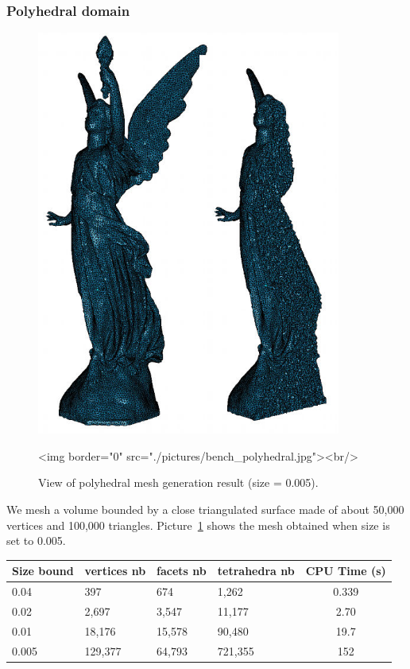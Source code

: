 \subsubsection{Polyhedral domain}

\begin{figure}[ht]
\begin{center}
 \begin{ccTexOnly}
   \includegraphics[width=10cm]{Mesh_3/pictures/bench_polyhedral.jpg}
 \end{ccTexOnly}
 \begin{ccHtmlOnly}
   <img border="0" src="./pictures/bench_polyhedral.jpg"><br/>
 \end{ccHtmlOnly}
 \caption{View of polyhedral mesh generation result (size = 0.005).}
  \label{figure:mesh_3_benchmark_polyhedral}
\end{center}
\end{figure}

We mesh a volume bounded by a close triangulated surface made of about 50,000 vertices and 100,000 triangles.
Picture~\ref{figure:mesh_3_benchmark_polyhedral} shows the mesh obtained when
size is set to 0.005.

\begin{center}
\begin{tabular}{|l|l|l|l||c|}
  \hline
  Size bound & vertices nb & facets nb & tetrahedra nb & CPU Time (s) \\
  \hline
  0.04 & 397 & 674 & 1,262 & 0.339 \\
  0.02 & 2,697 & 3,547 & 11,177 & 2.70 \\
  0.01 & 18,176 & 15,578 & 90,480 & 19.7 \\
  0.005 & 129,377 & 64,793 & 721,355 & 152 \\
  \hline
\end{tabular}
\end{center}

